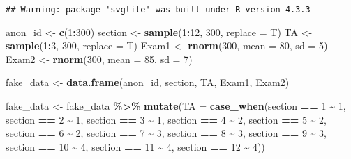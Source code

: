\documentclass[
]{article}
\newenvironment{Shaded}{\begin{snugshade}}{\end{snugshade}}
\newcommand{\AttributeTok}[1]{\textcolor[rgb]{0.13,0.29,0.53}{#1}}
\newcommand{\DecValTok}[1]{\textcolor[rgb]{0.00,0.00,0.81}{#1}}
\newcommand{\FunctionTok}[1]{\textcolor[rgb]{0.13,0.29,0.53}{\textbf{#1}}}
\newcommand{\NormalTok}[1]{#1}
\newcommand{\OtherTok}[1]{\textcolor[rgb]{0.56,0.35,0.01}{#1}}
\newcommand{\SpecialCharTok}[1]{\textcolor[rgb]{0.81,0.36,0.00}{\textbf{#1}}}
\begin{document}
\begin{verbatim}
## Warning: package 'svglite' was built under R version 4.3.3
\end{verbatim}

\begin{Shaded}
\begin{Highlighting}[]
\NormalTok{anon\_id }\OtherTok{\textless{}{-}} \FunctionTok{c}\NormalTok{(}\DecValTok{1}\SpecialCharTok{:}\DecValTok{300}\NormalTok{)}
\NormalTok{section }\OtherTok{\textless{}{-}} \FunctionTok{sample}\NormalTok{(}\DecValTok{1}\SpecialCharTok{:}\DecValTok{12}\NormalTok{, }\DecValTok{300}\NormalTok{, }\AttributeTok{replace =}\NormalTok{ T)}
\NormalTok{TA }\OtherTok{\textless{}{-}} \FunctionTok{sample}\NormalTok{(}\DecValTok{1}\SpecialCharTok{:}\DecValTok{3}\NormalTok{, }\DecValTok{300}\NormalTok{, }\AttributeTok{replace =}\NormalTok{ T)}
\NormalTok{Exam1 }\OtherTok{\textless{}{-}} \FunctionTok{rnorm}\NormalTok{(}\DecValTok{300}\NormalTok{, }\AttributeTok{mean =} \DecValTok{80}\NormalTok{, }\AttributeTok{sd =} \DecValTok{5}\NormalTok{)}
\NormalTok{Exam2 }\OtherTok{\textless{}{-}} \FunctionTok{rnorm}\NormalTok{(}\DecValTok{300}\NormalTok{, }\AttributeTok{mean =} \DecValTok{85}\NormalTok{, }\AttributeTok{sd =} \DecValTok{7}\NormalTok{)}

\NormalTok{fake\_data }\OtherTok{\textless{}{-}} \FunctionTok{data.frame}\NormalTok{(anon\_id, section, TA, Exam1, Exam2)}

\NormalTok{fake\_data }\OtherTok{\textless{}{-}}\NormalTok{ fake\_data }\SpecialCharTok{\%\textgreater{}\%} \FunctionTok{mutate}\NormalTok{(}\AttributeTok{TA =} \FunctionTok{case\_when}\NormalTok{(section }\SpecialCharTok{==} \DecValTok{1} \SpecialCharTok{\textasciitilde{}} \DecValTok{1}\NormalTok{, section }\SpecialCharTok{==} \DecValTok{2} \SpecialCharTok{\textasciitilde{}} \DecValTok{1}\NormalTok{, section }\SpecialCharTok{==} \DecValTok{3} \SpecialCharTok{\textasciitilde{}} \DecValTok{1}\NormalTok{, section }\SpecialCharTok{==} \DecValTok{4} \SpecialCharTok{\textasciitilde{}} \DecValTok{2}\NormalTok{, section }\SpecialCharTok{==} \DecValTok{5} \SpecialCharTok{\textasciitilde{}} \DecValTok{2}\NormalTok{, section }\SpecialCharTok{==} \DecValTok{6} \SpecialCharTok{\textasciitilde{}} \DecValTok{2}\NormalTok{, section }\SpecialCharTok{==} \DecValTok{7} \SpecialCharTok{\textasciitilde{}} \DecValTok{3}\NormalTok{, section }\SpecialCharTok{==} \DecValTok{8} \SpecialCharTok{\textasciitilde{}} \DecValTok{3}\NormalTok{, section }\SpecialCharTok{==} \DecValTok{9} \SpecialCharTok{\textasciitilde{}} \DecValTok{3}\NormalTok{, section }\SpecialCharTok{==} \DecValTok{10} \SpecialCharTok{\textasciitilde{}} \DecValTok{4}\NormalTok{, section }\SpecialCharTok{==} \DecValTok{11} \SpecialCharTok{\textasciitilde{}} \DecValTok{4}\NormalTok{, section }\SpecialCharTok{==} \DecValTok{12} \SpecialCharTok{\textasciitilde{}} \DecValTok{4}\NormalTok{))}


\end{Highlighting}
\end{Shaded}
\end{document}

